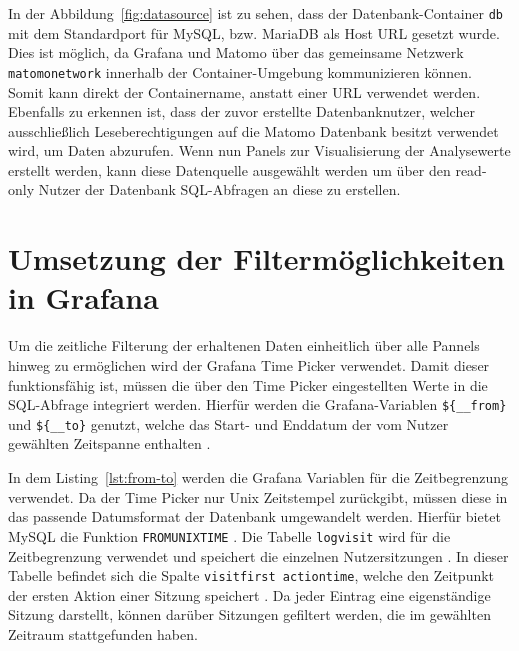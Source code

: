 In der Abbildung~\ref{fig:datasource} ist zu sehen, dass der Datenbank-Container \texttt{db} mit dem Standardport für MySQL, bzw. MariaDB als Host URL gesetzt wurde. Dies ist möglich, da Grafana und Matomo über das gemeinsame Netzwerk \texttt{matomo\textunderscore network} innerhalb der Container-Umgebung kommunizieren können. Somit kann direkt der Containername, anstatt einer URL verwendet werden. Ebenfalls zu erkennen ist, dass der zuvor erstellte Datenbanknutzer, welcher ausschließlich Leseberechtigungen auf die Matomo Datenbank besitzt verwendet wird, um Daten abzurufen. Wenn nun Panels zur Visualisierung der Analysewerte erstellt werden, kann diese Datenquelle ausgewählt werden um über den read-only Nutzer der Datenbank SQL-Abfragen an diese zu erstellen.

\section{Umsetzung der Filtermöglichkeiten in Grafana}
Um die zeitliche Filterung der erhaltenen Daten einheitlich über alle Pannels hinweg zu ermöglichen wird der Grafana Time Picker verwendet. Damit dieser funktionsfähig ist, müssen die über den Time Picker eingestellten Werte in die SQL-Abfrage integriert werden. Hierfür werden die Grafana-Variablen \texttt{\$\{\_\_from\}} und \texttt{\$\{\_\_to\}} genutzt, welche das Start- und Enddatum der vom Nutzer gewählten Zeitspanne enthalten \parencite{GrafanaTimePickerVariables}. 

\begin{figure}[H]
    \centering
    \begin{minipage}{\textwidth}
        
    \end{minipage}
\end{figure}

In dem Listing~\ref{lst:from-to} werden die Grafana Variablen für die Zeitbegrenzung verwendet. Da der Time Picker nur Unix Zeitstempel zurückgibt, müssen diese in das passende Datumsformat der Datenbank umgewandelt werden. Hierfür bietet MySQL die Funktion \texttt{FROM\textunderscore UNIXTIME} \parencite{MySQLUnixtime}. Die Tabelle \texttt{log\textunderscore visit} wird für die Zeitbegrenzung verwendet und speichert die einzelnen Nutzersitzungen \parencite{MatomoDBSchema}. In dieser Tabelle befindet sich die Spalte \texttt{visit\textunderscore first \textunderscore action\textunderscore time}, welche den Zeitpunkt der ersten Aktion einer Sitzung speichert \parencite{MatomoDBSchema}. Da jeder Eintrag eine eigenständige Sitzung darstellt, können darüber Sitzungen gefiltert werden, die im gewählten Zeitraum stattgefunden haben.

